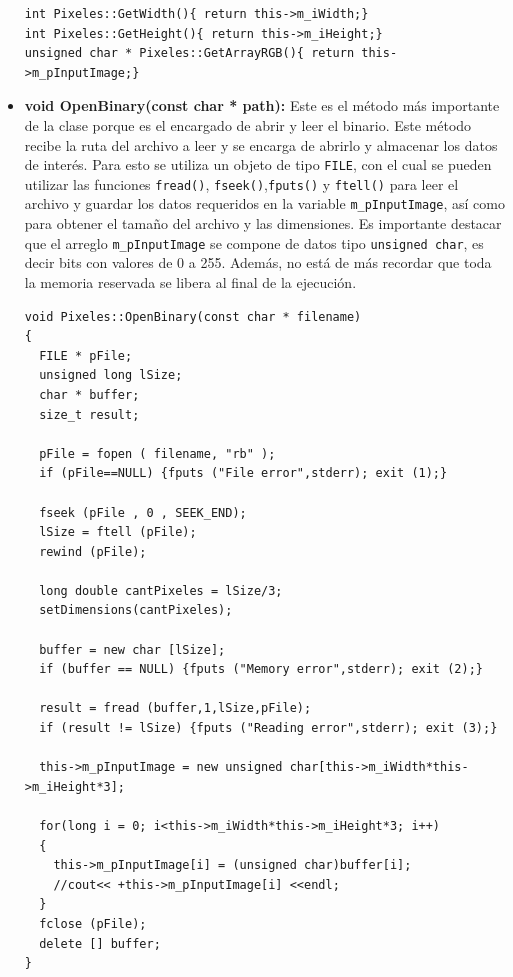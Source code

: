 \begin{itemize}
    \begin{verbatim}
int Pixeles::GetWidth(){ return this->m_iWidth;}
int Pixeles::GetHeight(){ return this->m_iHeight;}
unsigned char * Pixeles::GetArrayRGB(){ return this->m_pInputImage;}
\end{verbatim}
    \item \textbf{void OpenBinary(const char * path):} Este es el método más importante de la clase porque es el encargado de abrir y leer el binario. Este método recibe la ruta del archivo a leer y se encarga de abrirlo y almacenar los datos de interés. Para esto se utiliza un objeto de tipo \texttt{FILE}, con el cual se pueden utilizar las funciones \texttt{fread()}, \texttt{fseek()},\texttt{fputs()} y \texttt{ftell()} para leer el archivo y guardar los datos requeridos en la variable \texttt{m\_pInputImage}, así como para obtener el tamaño del archivo y las dimensiones. Es importante destacar que el arreglo \texttt{m\_pInputImage} se compone de datos tipo \texttt{unsigned char}, es decir bits con valores de 0 a 255. Además, no está de más recordar que toda la memoria reservada se libera al final de la ejecución.
    
    \begin{verbatim}
void Pixeles::OpenBinary(const char * filename)
{
  FILE * pFile;
  unsigned long lSize;
  char * buffer;
  size_t result;

  pFile = fopen ( filename, "rb" );
  if (pFile==NULL) {fputs ("File error",stderr); exit (1);}

  fseek (pFile , 0 , SEEK_END);
  lSize = ftell (pFile);
  rewind (pFile);
  
  long double cantPixeles = lSize/3;
  setDimensions(cantPixeles);

  buffer = new char [lSize];
  if (buffer == NULL) {fputs ("Memory error",stderr); exit (2);}

  result = fread (buffer,1,lSize,pFile);
  if (result != lSize) {fputs ("Reading error",stderr); exit (3);}

  this->m_pInputImage = new unsigned char[this->m_iWidth*this->m_iHeight*3];

  for(long i = 0; i<this->m_iWidth*this->m_iHeight*3; i++)
  {
    this->m_pInputImage[i] = (unsigned char)buffer[i];
    //cout<< +this->m_pInputImage[i] <<endl;
  }
  fclose (pFile);
  delete [] buffer;
}
    \end{verbatim}
    
\end{itemize}

